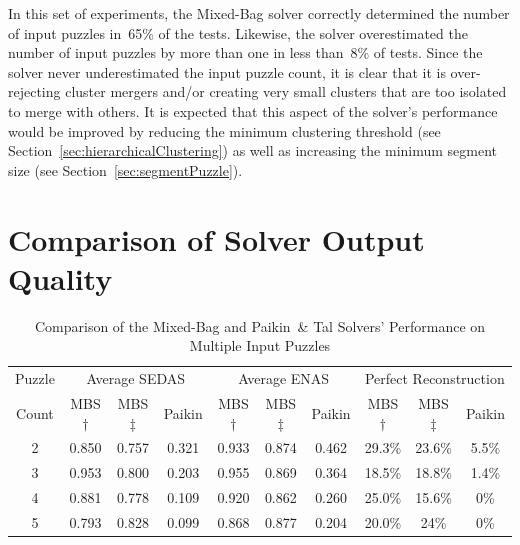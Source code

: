 In this set of experiments, the Mixed-Bag solver correctly determined the number of input puzzles in~65\% of the tests.  Likewise, the solver overestimated the number of input puzzles by more than one in less than~8\% of tests.  Since the solver never underestimated the input puzzle count, it is clear that it is over-rejecting cluster mergers and/or creating very small clusters that are too isolated to merge with others.  It is expected that this aspect of the solver's performance would be improved by reducing the minimum clustering threshold (see Section~\ref{sec:hierarchicalClustering}) as well as increasing the minimum segment size (see Section~\ref{sec:segmentPuzzle}). 

\section{Comparison of Solver Output Quality}\label{sec:comparisonOfSolverOutputQuality}

\begin{table}[tb]
\begin{center}
\caption{Comparison of the Mixed-Bag and Paikin~\& Tal Solvers' Performance on Multiple Input Puzzles}\label{tab:tableSolverPerformanceComparison}
\begin{tabular}{ c||c|c|c||c|c|c||c|c|c } 
 \toprule
 Puzzle & \multicolumn{3}{c||}{Average SEDAS} & \multicolumn{3}{c||}{Average ENAS} & \multicolumn{3}{c}{Perfect Reconstruction} \\ \cline{2-10}
 Count & MBS$\dagger$ & MBS$\ddagger$ & Paikin & MBS$\dagger$ & MBS$\ddagger$ & Paikin & MBS$\dagger$ & MBS$\ddagger$ & Paikin \\ 
 \hline \hline
 
	2 & 0.850 & 0.757 & 0.321 & 0.933 & 0.874 & 0.462 & 29.3\% & 23.6\% & 5.5\% \\ \hline
 
	3 & 0.953 & 0.800 & 0.203 & 0.955 & 0.869 & 0.364 & 18.5\% & 18.8\% & 1.4\% \\ \hline
  
	4 & 0.881 & 0.778 & 0.109 & 0.920 & 0.862 & 0.260 & 25.0\% & 15.6\% & 0\% \\ \hline
  
	5 & 0.793 & 0.828 & 0.099 & 0.868 & 0.877 & 0.204 & 20.0\% & 24\% & 0\% \\ 
 \bottomrule
\end{tabular}
\end{center}
\end{table}


